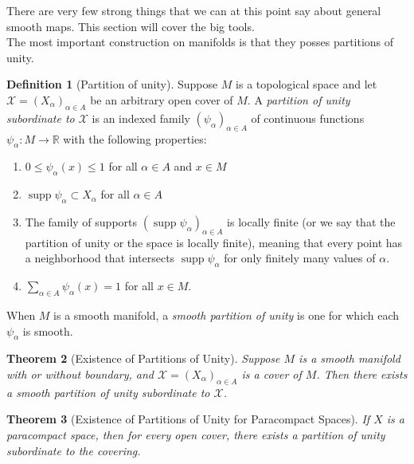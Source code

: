 \documentclass[reqno]{amsart}
\newtheorem{theorem}{Theorem}[section]
\theoremstyle{definition}
\newtheorem{definition}[theorem]{Definition}
\theoremstyle{remark}
\DeclareMathOperator{\supp}{supp}
\begin{document}
There are very few strong things that we can at this point
say about general smooth maps. This section will cover
the big tools.\\

The most important construction on manifolds is
that they posses partitions of unity.

\begin{definition}[Partition of unity]
    Suppose $M$ is a topological space and let
    $\mathcal{X} = \left( X_{\alpha} \right)_{\alpha \in A}$ 
    be an arbitrary open cover
    of $M$. A \textit{partition of unity
    subordinate to $\mathcal{X}$} is
    an indexed family
    $\left( \psi_{\alpha} \right)_{\alpha \in A}$ of 
    continuous functions
    $\psi_{\alpha} \colon M \to \mathbb{R}$ with the
    following properties:
    \begin{enumerate}
        \item $0 \le \psi_{\alpha}(x) \le 1$ for all
            $\alpha \in A$ and $x \in M$ 
        \item $\supp \psi_{\alpha} \subset X_{\alpha}$
            for all $\alpha \in A$ 
        \item The family of supports
            $\left( \supp \psi_{\alpha} \right)_{\alpha
            \in A}$ is locally finite (or we say
            that the partition of unity or the space
            is locally finite), meaning that
            every point has a neighborhood that intersects
            $\supp \psi_{\alpha}$ for only finitely many
            values of $\alpha$.
        \item $\sum_{\alpha \in A}\psi_{\alpha}(x) = 1$
            for all $x \in M$.
    \end{enumerate}
    When $M$ is a smooth manifold, a
    \textit{smooth partition of unity} is one for which
    each $\psi_{\alpha}$ is smooth.
\end{definition}

\begin{theorem}[Existence of Partitions of Unity]
    Suppose $M$ is a smooth manifold with
    or without boundary, and
    $\mathcal{X} = \left( X_{\alpha} \right)_{\alpha \in A}$ 
    is a cover of $M$. Then there
    exists a smooth partition of unity subordinate
    to $\mathcal{X}$.
\end{theorem}

\begin{theorem}[Existence of Partitions of Unity for
    Paracompact Spaces]
    If $X$ is a paracompact space, then for every
    open cover, there exists a partition of
    unity subordinate to the covering.
\end{theorem}
\end{document}

